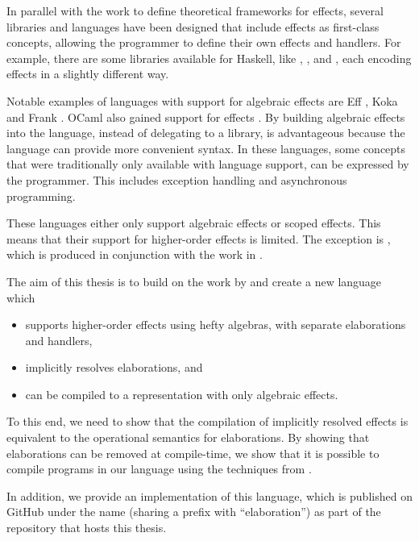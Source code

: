 In parallel with the work to define theoretical frameworks for effects, several libraries and languages have been designed that include effects as first-class concepts, allowing the programmer to define their own effects and handlers. For example, there are some libraries available for Haskell, like , ,  and , each encoding effects in a slightly different way.

Notable examples of languages with support for algebraic effects are Eff \cite{bauer_programming_2015}, Koka \cite{leijen_type_2017} and Frank \cite{lindley_be_2017}. OCaml also gained support for effects \cite{sivaramakrishnan_retrofitting_2021}. By building algebraic effects into the language, instead of delegating to a library, is advantageous because the language can provide more convenient syntax. In these languages, some concepts that were traditionally only available with language support, can be expressed by the programmer. This includes exception handling and asynchronous programming.

These languages either only support algebraic effects or scoped effects. This means that their support for higher-order effects is limited. The exception is , which is produced in conjunction with the work in \cite{bach_poulsen_hefty_2023}.

The aim of this thesis is to build on the work by \citeauthor{bach_poulsen_hefty_2023} and create a new language which

\begin{itemize}
    \item supports higher-order effects using hefty algebras, with separate elaborations and handlers,
    \item implicitly resolves elaborations, and
    \item can be compiled to a representation with only algebraic effects.
\end{itemize}

To this end, we need to show that the compilation of implicitly resolved effects is equivalent to the operational semantics for elaborations. By showing that elaborations can be removed at compile-time, we show that it is possible to compile programs in our language using the techniques from \cite{leijen_type_2017}.

In addition, we provide an implementation of this language, which is published on GitHub under the name  (sharing a prefix with ``elaboration'') as part  of the repository that hosts this thesis.
